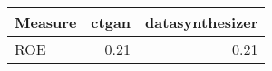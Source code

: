 \begin{tabular}{lrr}
  \toprule
Measure & ctgan & datasynthesizer \\ 
  \midrule
ROE & 0.21 & 0.21 \\ 
   \bottomrule
\end{tabular}
